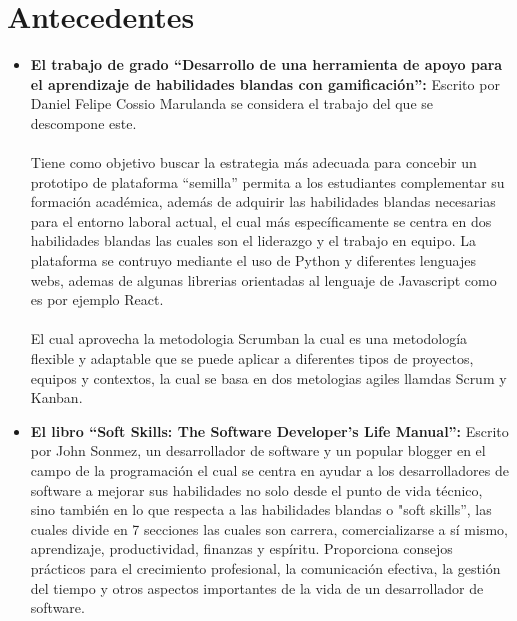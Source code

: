 \section{Antecedentes}
\begin{itemize}
    \item \textbf{El trabajo de grado “Desarrollo de una herramienta de apoyo para el aprendizaje de habilidades blandas con gamificación”:} Escrito por Daniel Felipe Cossio Marulanda se considera el trabajo del que se descompone este.
    \\ \\
Tiene como objetivo buscar la estrategia más adecuada para concebir un prototipo de plataforma “semilla” permita a los estudiantes complementar su formación académica, además de adquirir las habilidades blandas necesarias para el entorno laboral actual, el cual más específicamente se centra en dos habilidades blandas las cuales son el liderazgo y el trabajo en equipo. La plataforma se contruyo mediante el uso de Python y diferentes lenguajes webs, ademas de algunas librerias orientadas al lenguaje de Javascript como es por ejemplo  React.
 \\ \\
El cual aprovecha la metodologia Scrumban la cual es una metodología flexible y adaptable que se puede aplicar a diferentes tipos de proyectos, equipos y contextos, la cual se basa en dos metologias agiles llamdas Scrum y Kanban.

    \item \textbf{El libro “Soft Skills: The Software Developer's Life Manual”:} Escrito por John Sonmez, un desarrollador de software y un popular blogger en el campo de la programación el cual se centra en ayudar a los desarrolladores de software a mejorar sus habilidades no solo desde el punto de vida técnico, sino también en lo que respecta a las habilidades blandas o "soft skills”, las cuales divide en 7 secciones las cuales son carrera, comercializarse a sí mismo, aprendizaje, productividad, finanzas y espíritu. Proporciona consejos prácticos para el crecimiento profesional, la comunicación efectiva, la gestión del tiempo y otros aspectos importantes de la vida de un desarrollador de software.\cite{c}
    

\end{itemize}
